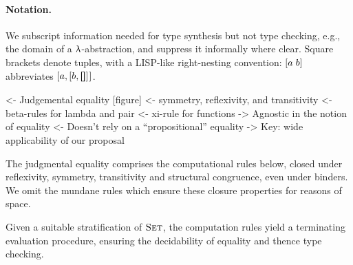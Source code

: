 \paragraph{Notation.} We subscript information needed for type synthesis
but not type checking, e.g., the domain of a \(\LAMBINDER\)-abstraction,
and suppress it informally where clear. Square brackets denote tuples,
with a LISP-like right-nesting convention: \(\sqr{a\;b}\) abbreviates
\(\pair{a}{\pair{b}{\void}{}}{}\).



%
%
%
%


\begin{wstructure}
<- Judgemental equality [figure]
    <- symmetry, reflexivity, and transitivity
    <- beta-rules for lambda and pair
    <- xi-rule for functions
    -> Agnostic in the notion of equality
        <- Doesn't rely on a ``propositional'' equality
        -> Key: wide applicability of our proposal
\end{wstructure}

The judgmental equality comprises the computational rules below,
closed under reflexivity,
symmetry, transitivity and structural congruence, even under binders.
We omit the mundane rules which ensure these closure properties for
reasons of space.

Given a suitable stratification of \(\Set\), the
computation rules yield a terminating evaluation procedure, ensuring
the decidability of equality and thence type checking.


